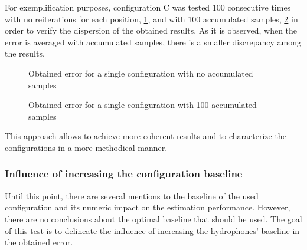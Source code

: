For exemplification purposes, configuration C was tested 100 consecutive times with no reiterations for each position, \ref{fig:plot-accum0}, and with 100 accumulated samples, \ref{fig:plot-accum100} in order to verify the dispersion of the obtained results. As it is observed, when the error is averaged with accumulated samples, there is a smaller discrepancy among the results.

\begin{figure}[!htbp]
	\captionsetup{justification=centering,margin=2cm}
	\caption{Obtained error for a single configuration with no accumulated samples}
	\label{fig:plot-accum0}
\end{figure}

\begin{figure}[!htbp]
	\captionsetup{justification=centering,margin=2cm}
	\caption{Obtained error for a single configuration with 100 accumulated samples}
	\label{fig:plot-accum100}
\end{figure}

This approach allows to achieve more coherent results and to characterize the configurations in a more methodical manner.

\subsubsection{Influence of increasing the configuration baseline}

Until this point, there are several mentions to the baseline of the used configuration and its numeric impact on the estimation performance. However, there are no conclusions about the optimal baseline that should be used. The goal of this test is to delineate the influence of increasing the hydrophones' baseline in the obtained error. 

